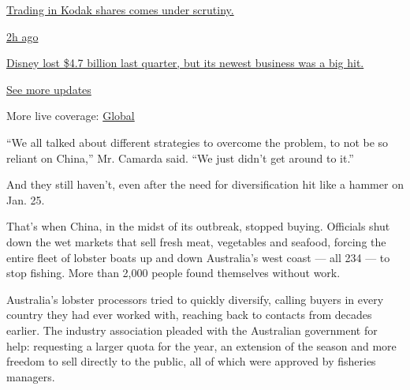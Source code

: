 \href{https://www.nytimes3xbfgragh.onion/live/2020/08/04/business/stock-market-today-coronavirus?action=click\&pgtype=Article\&state=default\&region=MAIN_CONTENT_1\&context=storylines_live_updates\#trading-in-kodak-shares-comes-under-scrutiny}{Trading
in Kodak shares comes under scrutiny.}

\href{https://www.nytimes3xbfgragh.onion/live/2020/08/04/business/stock-market-today-coronavirus?action=click\&pgtype=Article\&state=default\&region=MAIN_CONTENT_1\&context=storylines_live_updates\#disney-lost-4-7-billion-last-quarter-but-its-newest-business-was-a-big-hit}{2h
ago}

\href{https://www.nytimes3xbfgragh.onion/live/2020/08/04/business/stock-market-today-coronavirus?action=click\&pgtype=Article\&state=default\&region=MAIN_CONTENT_1\&context=storylines_live_updates\#disney-lost-4-7-billion-last-quarter-but-its-newest-business-was-a-big-hit}{Disney
lost \$4.7 billion last quarter, but its newest business was a big hit.}

\href{https://www.nytimes3xbfgragh.onion/live/2020/08/04/business/stock-market-today-coronavirus?action=click\&pgtype=Article\&state=default\&region=MAIN_CONTENT_1\&context=storylines_live_updates}{See
more updates}

More live coverage:
\href{https://www.nytimes3xbfgragh.onion/2020/08/04/world/coronavirus-cases.html?action=click\&pgtype=Article\&state=default\&region=MAIN_CONTENT_1\&context=storylines_live_updates}{Global}

``We all talked about different strategies to overcome the problem, to
not be so reliant on China,'' Mr. Camarda said. ``We just didn't get
around to it.''

And they still haven't, even after the need for diversification hit like
a hammer on Jan. 25.

That's when China, in the midst of its outbreak, stopped buying.
Officials shut down the wet markets that sell fresh meat, vegetables and
seafood, forcing the entire fleet of lobster boats up and down
Australia's west coast --- all 234 --- to stop fishing. More than 2,000
people found themselves without work.

Australia's lobster processors tried to quickly diversify, calling
buyers in every country they had ever worked with, reaching back to
contacts from decades earlier. The industry association pleaded with the
Australian government for help: requesting a larger quota for the year,
an extension of the season and more freedom to sell directly to the
public, all of which were approved by fisheries managers.


